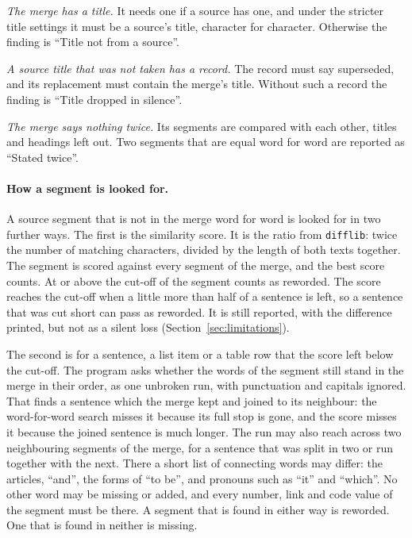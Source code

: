 \begin{points}
\item \emph{The merge has a title.} It needs one if a source has one, and under the stricter title settings it must be a source's title, character for character. Otherwise the finding is ``Title not from a source''.
\item \emph{A source title that was not taken has a record.} The record must say superseded, and its replacement must contain the merge's title. Without such a record the finding is ``Title dropped in silence''.
\item \emph{The merge says nothing twice.} Its segments are compared with each other, titles and headings left out. Two segments that are equal word for word are reported as ``Stated twice''.
\end{points}

\paragraph{How a segment is looked for.} A source segment that is not in the merge word for word is looked for in two further ways. The first is the similarity score. It is the ratio from \texttt{difflib}: twice the number of matching characters, divided by the length of both texts together. The segment is scored against every segment of the merge, and the best score counts. At or above the cut-off of  the segment counts as reworded. The score reaches the cut-off when a little more than half of a sentence is left, so a sentence that was cut short can pass as reworded. It is still reported, with the difference printed, but not as a silent loss (Section~\ref{sec:limitations}).

The second is for a sentence, a list item or a table row that the score left below the cut-off. The program asks whether the words of the segment still stand in the merge in their order, as one unbroken run, with punctuation and capitals ignored. That finds a sentence which the merge kept and joined to its neighbour: the word-for-word search misses it because its full stop is gone, and the score misses it because the joined sentence is much longer. The run may also reach across two neighbouring segments of the merge, for a sentence that was split in two or run together with the next. There a short list of connecting words may differ: the articles, ``and'', the forms of ``to be'', and pronouns such as ``it'' and ``which''. No other word may be missing or added, and every number, link and code value of the segment must be there. A segment that is found in either way is reworded. One that is found in neither is missing.


